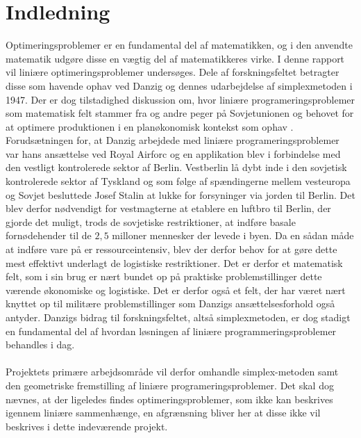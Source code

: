 \chapter{Indledning}
Optimeringsproblemer er en fundamental del af matematikken, og i den anvendte matematik udgøre disse en vægtig del af matematikkeres virke.
I denne rapport vil liniære optimeringsproblemer undersøges. 
Dele af forskningsfeltet betragter disse som havende ophav ved Danzig og dennes udarbejdelse af simplexmetoden \citep[side 107]{refa} i 1947.
Der er dog tilstadighed diskussion om, hvor liniære programeringsproblemer som matematisk felt stammer fra og andre peger på Sovjetunionen og behovet for at optimere produktionen i en planøkonomisk kontekst som ophav \citep[side 155]{refb}.
Forudsætningen for, at Danzig arbejdede med liniære programeringsproblemer var hans ansættelse ved Royal Airforc \citep[side 107]{refa} og en applikation blev i forbindelse med den vestligt kontrolerede sektor af Berlin.
Vestberlin lå dybt inde i den sovjetisk kontrolerede sektor af Tyskland og som følge af spændingerne mellem vesteuropa og Sovjet besluttede Josef Stalin at lukke for forsyninger via jorden til Berlin.
Det blev derfor nødvendigt for vestmagterne at etablere en luftbro til Berlin, der gjorde det muligt, trods de sovjetiske restriktioner, at indføre basale fornødehender til de $2,5$ milloner mennesker der levede i byen.
Da en sådan måde at indføre vare på er ressourceintensiv, blev der derfor behov for at gøre dette mest effektivt underlagt de logistiske restriktioner.
Det er derfor et matematisk felt, som i sin brug er nært bundet op på praktiske problemstillinger dette værende økonomiske og logistiske.
Det er derfor også et felt, der har været nært knyttet op til militære problemstillinger som Danzigs ansættelsesforhold også antyder.
Danzigs bidrag til forskningsfeltet, altså simplexmetoden, er dog stadigt en fundamental del af hvordan løsningen af liniære programmeringsproblemer behandles i dag.
\\\\
Projektets primære arbejdsområde vil derfor omhandle simplex-metoden samt den geometriske fremstilling af liniære programeringsproblemer.
Det skal dog nævnes, at der ligeledes findes optimeringsproblemer, som ikke kan beskrives igennem liniære sammenhænge, en afgrænsning bliver her at disse ikke vil beskrives i dette indeværende projekt.

